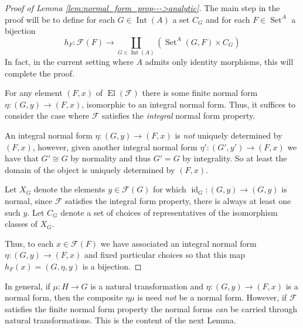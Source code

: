 \documentclass[12pt]{article}
\theoremstyle{plain}
\theoremstyle{definition}
\newcommand{\scr}[1]{\mathscr{#1}}
\newcommand{\lto}{\longrightarrow}
\DeclareMathOperator{\set}{Set}
\begin{document}
	\begin{proof}[Proof of Lemma \ref{lem:normal_form_prop--->analytic}]
		The main step in the proof will be to define for each $G \in \operatorname{Int}(A)$ a set $C_G$ and for each $F \in \set^A$ a bijection
		\begin{equation}\label{eq:bijection}
			h_F: \scr{F}(F) \lto \coprod_{G \in \operatorname{Int}(A)}(\operatorname{Set}^A(G, F) \times C_G)
			\end{equation}
		In fact, in the current setting where $A$ admits only identity morphisms, this will complete the proof.
		
		For any element $(F,x)$ of $\operatorname{El}(\scr{F})$ there is some finite normal form $\eta: (G,y) \lto (F,x)$, isomorphic to an integral normal form. Thus, it suffices to consider the case where $\scr{F}$ satisfies the \emph{integral} normal form property.
		
		An integral normal form $\eta: (G,y) \lto (F,x)$ is \emph{not} uniquely determined by $(F,x)$, however, given another integral normal form $\eta': (G',y') \lto (F,x)$ we have that $G' \cong G$ by normality and thus $G' = G$ by integrality. So at least the domain of the object is uniquely determined by $(F,x)$.
		
		Let $X_G$ denote the elements $y \in \scr{F}(G)$ for which $\operatorname{id}_G: (G,y) \lto (G,y)$ is normal, since $\scr{F}$ satisfies the integral form property, there is always at least one such $y$. Let $C_G$ denote a set of choices of representatives of the isomorphism classes of $X_G$.
				
		Thus, to each $x \in \scr{F}(F)$ we have associated an integral normal form $\eta: (G, y) \lto (F,x)$ and fixed particular choices so that this map $h_F(x) = (G, \eta, y)$ is a bijection.
		\end{proof}

In general, if $\mu: H \lto G$ is a natural transformation and $\eta: (G, y) \lto (F, x)$ is a normal form, then the composite $\eta \mu$ is need \emph{not} be a normal form. However, if $\scr{F}$ satisfies the finite normal form property the normal forms \emph{can} be carried through natural transformations. This is the content of the next Lemma.
 
\end{document}
